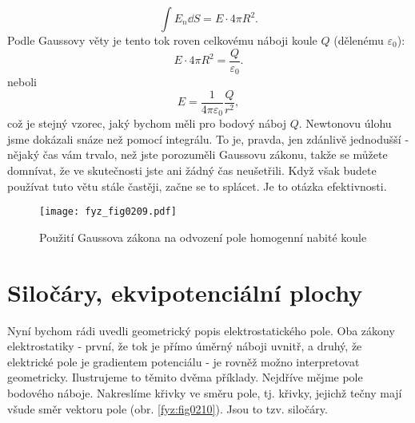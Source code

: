     \begin{equation*}
      \int E_n\dd{S} = E\cdot4\pi R^2.
    \end{equation*} 
    Podle Gaussovy věty je tento tok roven celkovému náboji koule \(Q\) (dělenému 
    \(\varepsilon_0\)):
    \begin{equation*}
      E\cdot4\pi R^2 = \frac{Q}{\varepsilon_0}.
    \end{equation*} 
    neboli
    \begin{equation*}
      E  = \frac{1}{4\pi\varepsilon_0}\frac{Q}{r^2},
    \end{equation*}
    \noindent což je stejný vzorec, jaký bychom měli pro bodový náboj \(Q\). Newtonovu úlohu jsme 
    dokázali snáze než pomocí integrálu. To je, pravda, jen zdánlivě jednodušší - nějaký čas vám 
    trvalo, než jste porozuměli Gaussovu zákonu, takže se můžete domnívat, že ve skutečnosti jste 
    ani žádný čas neušetřili. Když však budete používat tuto větu stále častěji, začne se to 
    splácet. Je to otázka efektivnosti.    
    \begin{figure}[ht!]
      \centering
      \texttt{[image: fyz\_fig0209.pdf]}
      \caption{Použití Gaussova zákona na odvození pole homogenní nabité koule}
      \label{fyz:fig0209}  
    \end{figure}
   

  \section{Siločáry, ekvipotenciální plochy}\label{fyz:IIchapIVsecVIII}
    Nyní bychom rádi uvedli geometrický popis elektrostatického pole. Oba zákony elektrostatiky - 
    první, že tok je přímo úměrný náboji uvnitř, a druhý, že elektrické pole je gradientem 
    potenciálu - je rovněž možno interpretovat geometricky. Ilustrujeme to těmito dvěma příklady. 
    Nejdříve mějme pole bodového náboje. Nakreslíme křivky ve směru pole, tj. křivky, jejichž tečny 
    mají všude směr vektoru pole (obr. \ref{fyz:fig0210}). Jsou to tzv. siločáry. 
    \cite[s.~78]{Feynman02}
    
